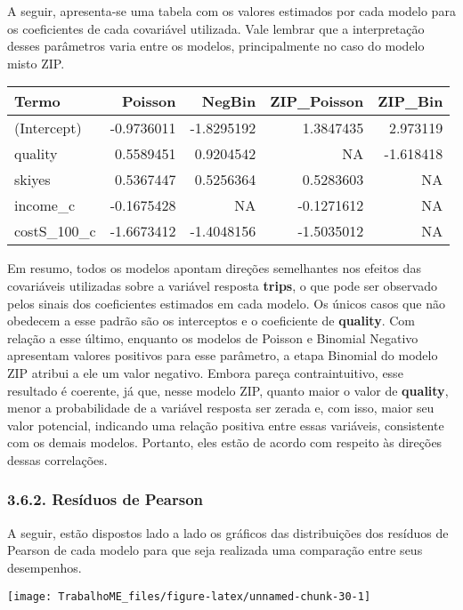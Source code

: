 \documentclass[
]{article}
\begin{document}
A seguir, apresenta-se uma tabela com os valores estimados por cada
modelo para os coeficientes de cada covariável utilizada. Vale lembrar
que a interpretação desses parâmetros varia entre os modelos,
principalmente no caso do modelo misto ZIP.

\begin{longtable}[]{@{}lrrrr@{}}
\toprule\noalign{}
Termo & Poisson & NegBin & ZIP\_Poisson & ZIP\_Bin \\
\midrule\noalign{}
\endhead
\bottomrule\noalign{}
\endlastfoot
(Intercept) & -0.9736011 & -1.8295192 & 1.3847435 & 2.973119 \\
quality & 0.5589451 & 0.9204542 & NA & -1.618418 \\
skiyes & 0.5367447 & 0.5256364 & 0.5283603 & NA \\
income\_c & -0.1675428 & NA & -0.1271612 & NA \\
costS\_100\_c & -1.6673412 & -1.4048156 & -1.5035012 & NA \\
\end{longtable}

Em resumo, todos os modelos apontam direções semelhantes nos efeitos das
covariáveis utilizadas sobre a variável resposta \textbf{trips}, o que
pode ser observado pelos sinais dos coeficientes estimados em cada
modelo. Os únicos casos que não obedecem a esse padrão são os
interceptos e o coeficiente de \textbf{quality}. Com relação a esse
último, enquanto os modelos de Poisson e Binomial Negativo apresentam
valores positivos para esse parâmetro, a etapa Binomial do modelo ZIP
atribui a ele um valor negativo. Embora pareça contraintuitivo, esse
resultado é coerente, já que, nesse modelo ZIP, quanto maior o valor de
\textbf{quality}, menor a probabilidade de a variável resposta ser
zerada e, com isso, maior seu valor potencial, indicando uma relação
positiva entre essas variáveis, consistente com os demais modelos.
Portanto, eles estão de acordo com respeito às direções dessas
correlações.

\subsubsection{3.6.2. Resíduos de
Pearson}\label{resuxedduos-de-pearson-1}

A seguir, estão dispostos lado a lado os gráficos das distribuições dos
resíduos de Pearson de cada modelo para que seja realizada uma
comparação entre seus desempenhos.

\begin{center}\texttt{[image: TrabalhoME\_files/figure-latex/unnamed-chunk-30-1]} \end{center}
\end{document}
